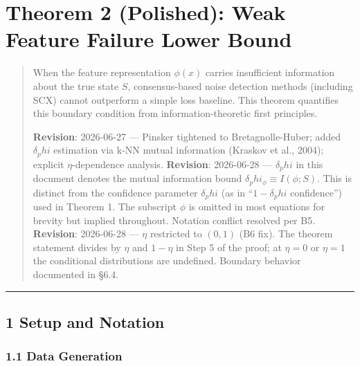 \documentclass[
  12pt,
]{ctexart}
\author{SCX}
\date{2026}
\begin{document}
\section{Theorem 2 (Polished): Weak Feature Failure Lower
Bound}\label{theorem-2-polished-weak-feature-failure-lower-bound}

\begin{quote}
When the feature representation \(\phi(x)\) carries insufficient
information about the true state \(S\), consensus-based noise detection
methods (including SCX) cannot outperform a simple loss baseline. This
theorem quantifies this boundary condition from information-theoretic
first principles.

\textbf{Revision}: 2026-06-27 --- Pinsker tightened to
Bretagnolle-Huber; added \(\delta_phi\) estimation via k-NN mutual
information (Kraskov et al., 2004); explicit \(\eta\)-dependence
analysis. \textbf{Revision}: 2026-06-28 --- \(\delta_phi\) in this
document denotes the mutual information bound
\(\delta_phi_\phi \equiv I(\phi;S)\). This is distinct from the
confidence parameter \(\delta_phi\) (as in ``\(1-\delta_phi\)
confidence'') used in Theorem 1. The subscript \(\phi\) is omitted in
most equations for brevity but implied throughout. Notation conflict
resolved per B5. \textbf{Revision}: 2026-06-28 --- \(\eta\) restricted
to \((0,1)\) (B6 fix). The theorem statement divides by \(\eta\) and
\(1-\eta\) in Step 5 of the proof; at \(\eta=0\) or \(\eta=1\) the
conditional distributions are undefined. Boundary behavior documented in
§6.4.
\end{quote}

\begin{center}\rule{0.5\linewidth}{0.5pt}\end{center}

\subsection{1 Setup and Notation}\label{setup-and-notation}

\subsubsection{1.1 Data Generation}\label{data-generation}
\end{document}
